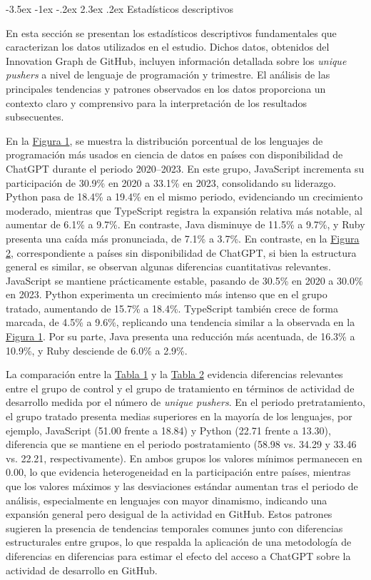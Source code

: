 \documentclass[12pt,a4paper]{article}
\makeatletter
\renewcommand\section{\@startsection{section}{1}{\z@}%
  {-3.5ex \@plus -1ex \@minus -.2ex}%
  {2.3ex \@plus.2ex}%
  {\normalfont\normalsize}}
\makeatother
\begin{document}
\clearpage
\section{Estadísticos descriptivos}

En esta sección se presentan los estadísticos descriptivos fundamentales que caracterizan los datos utilizados en el estudio. Dichos datos, obtenidos del Innovation Graph de GitHub, incluyen información detallada sobre los \textit{unique pushers} a nivel de lenguaje de programación y trimestre. El análisis de las principales tendencias y patrones observados en los datos proporciona un contexto claro y comprensivo para la interpretación de los resultados subsecuentes.

En la \hyperref[fig:figura1]{Figura 1}, se muestra la distribución porcentual de los lenguajes de programación más usados en ciencia de datos en países con disponibilidad de ChatGPT durante el periodo 2020–2023. En este grupo, JavaScript incrementa su participación de 30.9\% en 2020 a 33.1\% en 2023, consolidando su liderazgo. Python pasa de 18.4\% a 19.4\% en el mismo periodo, evidenciando un crecimiento moderado, mientras que TypeScript registra la expansión relativa más notable, al aumentar de 6.1\% a 9.7\%. En contraste, Java disminuye de 11.5\% a 9.7\%, y Ruby presenta una caída más pronunciada, de 7.1\% a 3.7\%. En contraste, en la \hyperref[fig:figura2]{Figura 2}, correspondiente a países sin disponibilidad de ChatGPT, si bien la estructura general es similar, se observan algunas diferencias cuantitativas relevantes. JavaScript se mantiene prácticamente estable, pasando de 30.5\% en 2020 a 30.0\% en 2023. Python experimenta un crecimiento más intenso que en el grupo tratado, aumentando de 15.7\% a 18.4\%. TypeScript también crece de forma marcada, de 4.5\% a 9.6\%, replicando una tendencia similar a la observada en la \hyperref[fig:figura1]{Figura 1}. Por su parte, Java presenta una reducción más acentuada, de 16.3\% a 10.9\%, y Ruby desciende de 6.0\% a 2.9\%.

La comparación entre la \hyperref[tab:tabla1]{Tabla 1} y la \hyperref[tab:tabla2]{Tabla 2} evidencia diferencias relevantes entre el grupo de control y el grupo de tratamiento en términos de actividad de desarrollo medida por el número de \textit{unique pushers}. En el periodo pretratamiento, el grupo tratado presenta medias superiores en la mayoría de los lenguajes, por ejemplo, JavaScript (51.00 frente a 18.84) y Python (22.71 frente a 13.30), diferencia que se mantiene en el periodo postratamiento (58.98 vs. 34.29 y 33.46 vs. 22.21, respectivamente). En ambos grupos los valores mínimos permanecen en 0.00, lo que evidencia heterogeneidad en la participación entre países, mientras que los valores máximos y las desviaciones estándar aumentan tras el periodo de análisis, especialmente en lenguajes con mayor dinamismo, indicando una expansión general pero desigual de la actividad en GitHub. Estos patrones sugieren la presencia de tendencias temporales comunes junto con diferencias estructurales entre grupos, lo que respalda la aplicación de una metodología de diferencias en diferencias para estimar el efecto del acceso a ChatGPT sobre la actividad de desarrollo en GitHub.
\end{document}
